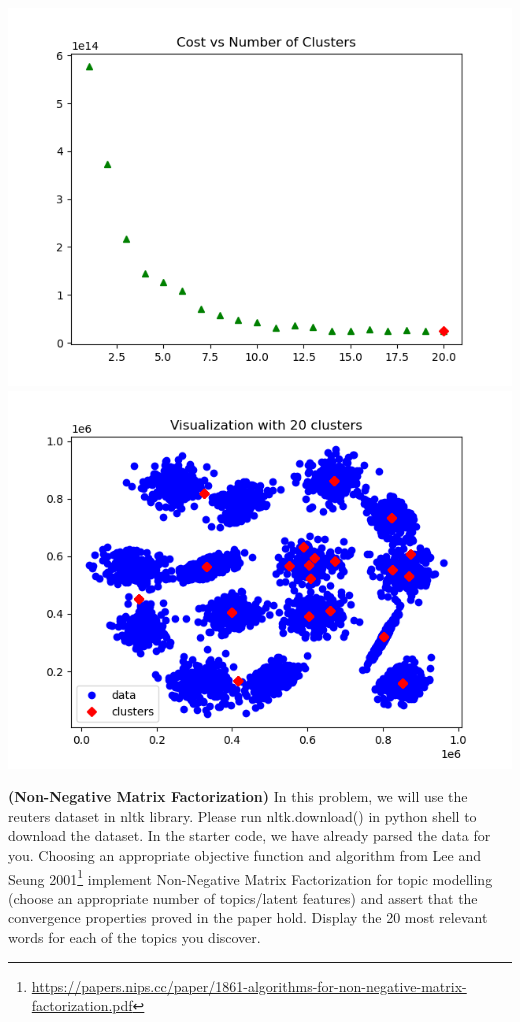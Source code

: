 \documentclass[12pt,letterpaper,fleqn]{hmcpset}
\begin{document}
\begin{solution}
\begin{center}
	\includegraphics[scale=0.9]{kmeans_1.png}
	\includegraphics[scale=0.9]{kmeans_2.png}
\end{center}
\end{solution}
\newpage




\begin{problem}
\textbf{(Non-Negative Matrix Factorization)} 
In this problem, we will use the reuters dataset in nltk library. Please run nltk.download() in python shell to download the dataset. In the starter code, we have already parsed the data for you. 
\newline
\newline
Choosing an appropriate
objective function and algorithm from Lee and Seung 2001\footnote{\url{https://papers.nips.cc/paper/1861-algorithms-for-non-negative-matrix-factorization.pdf}}
implement Non-Negative Matrix Factorization for topic modelling (choose an appropriate number
of topics/latent features) and assert that the convergence properties proved in the paper hold. 
Display the 20 most relevant words for each of the topics you discover.
\end{problem}
\begin{solution}
\vfill
\end{solution}
\newpage
\end{document}
